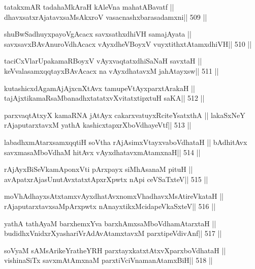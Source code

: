 \begin{shl}
tatakxmAR tadahaMkAraH kAleVna mahatA\s Bavatf ||
dhavxsatxrAjatavxsaMsAkxroV vasacnashxbarasadamxni\hfill || 509 ||
\end{shl}

\begin{shl}
shuBwSadhuyxpayoVgAcacx savxsathxdhiVH samajAyata ||
savxsavxBAvAnuroVdhAcacx vAyxdheVBoyxV vuyxtithxtAtamxdhiVH\hfill || 510 ||
\end{shl}

\begin{shl}
taciCxVlarUpakamaRBoyxV vAyxvaqtatxdhiSaNaH savxtaH ||
keVvalasamxqqtayxBAvAcacx na vAyxdhatavxM jahAtayxsw\hfill || 511 ||
\end{shl}

\begin{shl}
kutashicxdAgamAjAjxcnXtAvx tamupeVtAyxparxtArakaH ||
tajAjxtikamaRsaMbanadhxtatatxvXvitatxtipxtuH saKA\hfill || 512 ||
\end{shl}

\begin{shl}
parxvaqtAtxyX kamaRNA jAtAyx cakarxvatuyxRciteYsatxthA ||
lakaSxNeY rAjaputarxtavxM yathA kashicxtapxrXboVdhayeVtf\hfill || 513 ||
\end{shl}

\begin{shl}
labadhxmAtarxsamxqqtiH soV\s tha rAjA\s simxVtayxvaboVdhataH ||
bAdhitAvx savxmasaMboVdhaM hitAvx vAyxdhatavxmAtamxnaH\hfill || 514 ||
\end{shl}

\begin{shl}
rAjAyxBiSeVkamAponxVti pArxpayx siMhAsanaM pituH ||
avApatxrAjasUnutAvxtatxtApxrXpwtx nApi ceVSaTxteV\hfill || 515 ||
\end{shl}

\begin{shl}
moVhAdhayxsAtxtamxvAyxdhatAvxnomxVhadhavxMsAtireVkataH ||
rAjaputarxtavxsaMpArxpwtx nAnayxtikxMcidapeVkaSxteV\hfill || 516 ||
\end{shl}

\begin{shl}
yathA tathA\s yaM barxhemxYva barxhAmxsaMboVdhamAtarxtaH ||
budidhxVnidxrXyashariVrAdAvAtamxtavxM parxtipeVdivAnf\hfill || 517 ||
\end{shl}

\begin{shl}
soV\s yaM sAMsArikeYratheYRH parxtayxkatxtAtxvXparxboVdhataH ||
vishinaSiTx savxmAtAmxnaM parxtiVciVnamanAtamxBiH\hfill || 518 ||
\end{shl}

